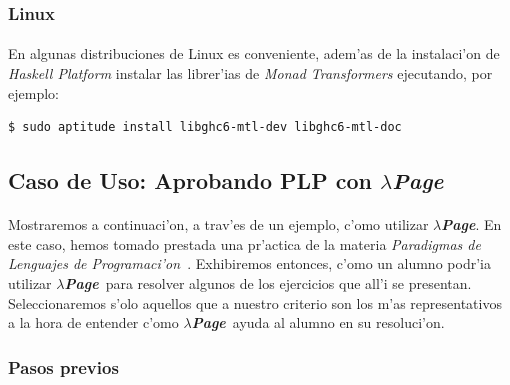 \documentclass[a4paper]{article}
\newcommand{\hpage}{\textbf{\textsl{$\lambda$Page}}}
\begin{document}
\subsubsection{Linux}
\paragraph{}En algunas distribuciones de Linux es conveniente, adem'as de la instalaci'on de \textsl{Haskell Platform} instalar las librer'ias de \textit{Monad Transformers} ejecutando, por ejemplo:
\begin{lstlisting}
$ sudo aptitude install libghc6-mtl-dev libghc6-mtl-doc
\end{lstlisting}
\newpage
\subsection{Caso de Uso: Aprobando PLP con \hpage}
\begin{epigraphs}
\end{epigraphs}
\paragraph{}Mostraremos a continuaci'on, a trav'es de un ejemplo, c'omo utilizar \hpage.  En este caso, hemos tomado prestada una pr'actica de la materia \textsl{Paradigmas de Lenguajes de Programaci'on}~\cite{plp}.  Exhibiremos entonces, c'omo un alumno podr'ia utilizar \hpage\ para resolver algunos de los ejercicios que all'i se presentan.  Seleccionaremos s'olo aquellos que a nuestro criterio son los m'as representativos a la hora de entender c'omo \hpage\ ayuda al alumno en su resoluci'on.

\subsubsection{Pasos previos}
\end{document}
